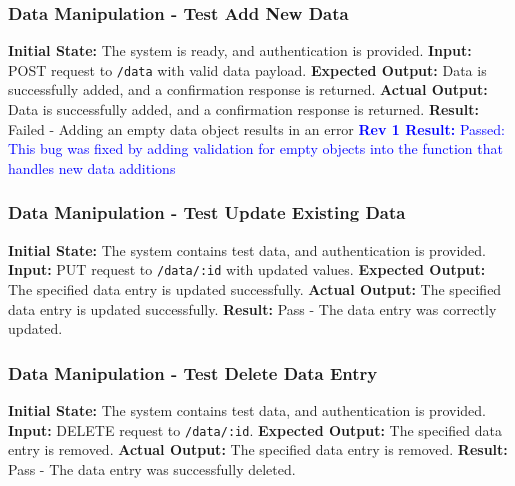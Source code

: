 \documentclass[12pt, titlepage]{article}
\begin{document}
\subsubsection{Data Manipulation - Test Add New Data} \textbf{Initial State:} The system is ready, and authentication is provided.\newline
\textbf{Input:} POST request to \texttt{/data} with valid data payload.\newline
\textbf{Expected Output:} Data is successfully added, and a confirmation response is returned.\newline
\textbf{Actual Output:} Data is successfully added, and a confirmation response is returned.\newline
\textbf{Result:} Failed - Adding an empty data object results in an error \newline
\textcolor{blue}{\textbf{Rev 1 Result:} Passed: This bug was fixed by adding validation for empty objects into the function that handles new data additions}

\subsubsection{Data Manipulation - Test Update Existing Data} \textbf{Initial State:} The system contains test data, and authentication is provided.\newline
\textbf{Input:} PUT request to \texttt{/data/:id} with updated values.\newline
\textbf{Expected Output:} The specified data entry is updated successfully.\newline
\textbf{Actual Output:} The specified data entry is updated successfully.\newline
\textbf{Result:} Pass - The data entry was correctly updated.

\subsubsection{Data Manipulation - Test Delete Data Entry} \textbf{Initial State:} The system contains test data, and authentication is provided.\newline
\textbf{Input:} DELETE request to \texttt{/data/:id}.\newline
\textbf{Expected Output:} The specified data entry is removed.\newline
\textbf{Actual Output:} The specified data entry is removed.\newline
\textbf{Result:} Pass - The data entry was successfully deleted.
\end{document}
